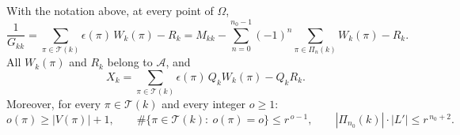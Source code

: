 \begin{lemma}\label{lem:FAexp}
With the notation above, at every point of $\Omega$,
\begin{equation}\label{eq:expansion}
 \frac1{G_{kk}}=\sum_{\pi\in\mathcal T(k)}\epsilon(\pi)\,W_k(\pi)-R_k=M_{kk}-\sum_{n=0}^{n_0-1}(-1)^n\!\!\sum_{\pi\in\Pi_n(k)}W_k(\pi)-R_k .
\end{equation}
All $W_k(\pi)$ and $R_k$ belong to $\mathcal A$, and
\begin{equation}\label{eq:FAX}
 X_k=\sum_{\pi\in\mathcal T(k)}\epsilon(\pi)\,Q_kW_k(\pi)-Q_kR_k .
\end{equation}
Moreover, for every $\pi\in\mathcal T(k)$ and every integer $o\ge1$:
\begin{equation}\label{eq:FAcountpaths}
 o(\pi)\ge|V(\pi)|+1,\qquad\#\{\pi\in\mathcal T(k):\ o(\pi)=o\}\le r^{\,o-1},\qquad|\Pi_{n_0}(k)|\cdot|L'|\le r^{\,n_0+2}.
\end{equation}
\end{lemma}
